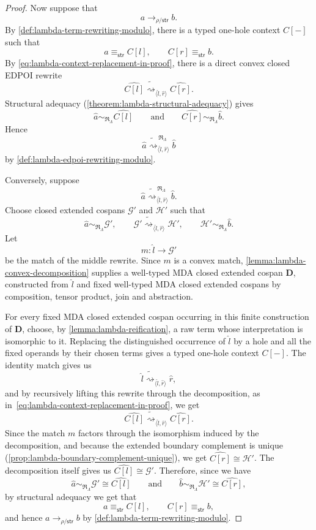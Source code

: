 \begin{proof}
Now suppose that
\[
  a\longrightarrow_{\rho/\mathsf{str}}b.
\]
By \cref{def:lambda-term-rewriting-modulo}, there is a typed one-hole
context \(C[-]\) such that
\[
  a\equiv_{\mathsf{str}}C[l],
  \qquad
  C[r]\equiv_{\mathsf{str}}b.
\]
By \eqref{eq:lambda-context-replacement-in-proof}, there is a direct
convex closed EDPOI rewrite
\[
  \widehat{C[l]}
  \mathrel{\widetilde{\rightsquigarrow}_{\langle\widehat l,\widehat r\rangle}}
  \widehat{C[r]}.
\]
Structural adequacy (\cref{theorem:lambda-structural-adequacy}) gives
\[
  \widehat a
  \sim_{\mathfrak R_\Lambda}
  \widehat{C[l]}
  \qquad\text{and}\qquad
  \widehat{C[r]}
  \sim_{\mathfrak R_\Lambda}
  \widehat b.
\]
Hence
\[
  \widehat a
  \mathrel{\widetilde{\rightsquigarrow}^{\,\mathfrak R_\Lambda}_{\langle\widehat l,\widehat r\rangle}}
  \widehat b
\]
by \cref{def:lambda-edpoi-rewriting-modulo}.

Conversely, suppose
\[
  \widehat a
  \mathrel{\widetilde{\rightsquigarrow}^{\,\mathfrak R_\Lambda}_{\langle\widehat l,\widehat r\rangle}}
  \widehat b.
\]
Choose closed extended cospans \(\mathcal G'\) and \(\mathcal H'\) such
that
\[
  \widehat a\sim_{\mathfrak R_\Lambda}\mathcal G',
  \qquad
  \mathcal G'
  \mathrel{\widetilde{\rightsquigarrow}_{\langle\widehat l,\widehat r\rangle}}
  \mathcal H',
  \qquad
  \mathcal H'\sim_{\mathfrak R_\Lambda}\widehat b.
\]
Let
\[
  m:\widehat l\longrightarrow\mathcal G'
\]
be the match of the middle rewrite. Since \(m\) is a convex match,
\cref{lemma:lambda-convex-decomposition} supplies a well-typed MDA
closed extended cospan \(\mathbf D\), constructed from \(\widehat l\)
and fixed well-typed MDA closed extended cospans by composition, tensor
product, join and abstraction.

For every fixed MDA closed extended cospan occurring in this finite
construction of \(\mathbf D\), choose, by
\cref{lemma:lambda-reification}, a raw term whose interpretation is
isomorphic to it. Replacing the distinguished occurrence of
\(\widehat l\) by a hole and all the fixed operands by their chosen
terms gives a typed one-hole context \(C[-]\). The identity match gives
us
\[
  \widehat l
  \mathrel{\widetilde{\rightsquigarrow}_{\langle\widehat l,\widehat r\rangle}}
  \widehat r,
\]
and by recursively lifting this rewrite through the decomposition,
as in~\eqref{eq:lambda-context-replacement-in-proof}, we get
\[
  \widehat{C[l]}
  \mathrel{\widetilde{\rightsquigarrow}_{\langle\widehat l,\widehat r\rangle}}
  \widehat{C[r]}.
\]
Since the match \(m\) factors through the isomorphism induced by the
decomposition, and because the extended boundary complement is unique
(\cref{prop:lambda-boundary-complement-unique}),
we get \(\widehat{C[r]}\cong\mathcal H'\). The decomposition itself
gives us \(\widehat{C[l]}\cong\mathcal G'\). Therefore, since we have
\[
  \widehat a\sim_{\mathfrak R_\Lambda}\mathcal G'\cong\widehat{C[l]}
  \qquad\text{and}\qquad
  \widehat b\sim_{\mathfrak R_\Lambda}\mathcal H'\cong\widehat{C[r]},
\]
by structural adequacy we get that
\[
  a\equiv_{\mathsf{str}}C[l],
  \qquad
  C[r]\equiv_{\mathsf{str}}b,
\]
and hence \(a\longrightarrow_{\rho/\mathsf{str}}b\) by
\cref{def:lambda-term-rewriting-modulo}.
\end{proof}

